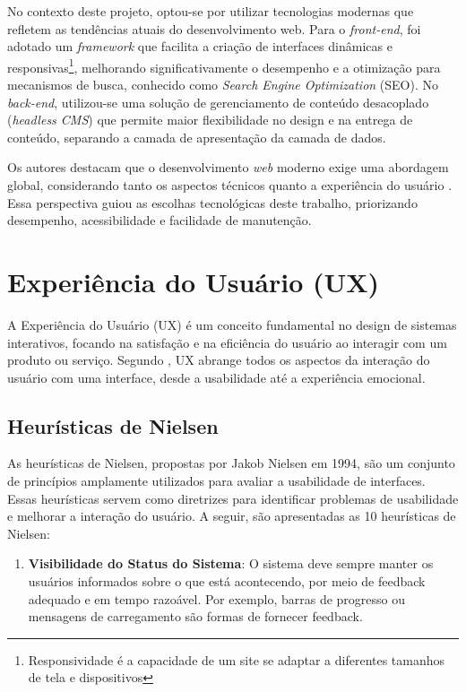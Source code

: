 {No contexto deste projeto, optou-se por utilizar tecnologias modernas que refletem as tendências atuais do desenvolvimento web. Para o \textit{front-end}, foi adotado um \textit{framework} que facilita a criação de interfaces dinâmicas e responsivas\footnote{Responsividade é a capacidade de um site se adaptar a diferentes tamanhos de tela e dispositivos}, melhorando significativamente o desempenho e a otimização para mecanismos de busca, conhecido como \textit{Search Engine Optimization} (SEO). No \textit{back-end}, utilizou-se uma solução de gerenciamento de conteúdo desacoplado (\textit{headless CMS}) que permite maior flexibilidade no design e na entrega de conteúdo, separando a camada de apresentação da camada de dados.

Os autores destacam que o desenvolvimento \textit{web} moderno exige uma abordagem global, considerando tanto os aspectos técnicos quanto a experiência do usuário . Essa perspectiva guiou as escolhas tecnológicas deste trabalho, priorizando desempenho, acessibilidade e facilidade de manutenção.

\section{Experiência do Usuário (UX)}
A Experiência do Usuário (UX) é um conceito fundamental no design de sistemas interativos, focando na satisfação e na eficiência do usuário ao interagir com um produto ou serviço. Segundo \cite{Norman}, UX abrange todos os aspectos da interação do usuário com uma interface, desde a usabilidade até a experiência emocional.

\subsection{Heurísticas de Nielsen}
As heurísticas de Nielsen, propostas por Jakob Nielsen em 1994, são um conjunto de princípios amplamente utilizados para avaliar a usabilidade de interfaces. Essas heurísticas servem como diretrizes para identificar problemas de usabilidade e melhorar a interação do usuário. A seguir, são apresentadas as 10 heurísticas de Nielsen:

\begin{enumerate}
    \item \textbf{Visibilidade do Status do Sistema}: O sistema deve sempre manter os usuários informados sobre o que está acontecendo, por meio de feedback adequado e em tempo razoável. Por exemplo, barras de progresso ou mensagens de carregamento são formas de fornecer feedback.


\end{enumerate}}
